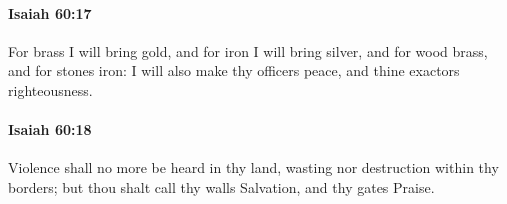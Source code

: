 		\paragraph{Isaiah 60:17} %
			\label{ISAIAH-60-17}

			For brass I will bring gold, and for iron I will bring silver, and for wood brass, and for stones iron: I will also make thy officers peace, and thine exactors righteousness.


		\paragraph{Isaiah 60:18} %
			\label{ISAIAH-60-18}

			Violence shall no more be heard in thy land, wasting nor destruction within thy borders; but thou shalt call thy walls Salvation, and thy gates Praise.



